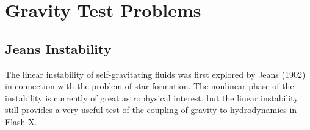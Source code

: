 
\section{Gravity Test Problems}

\subsection{Jeans Instability}
\label{Sec:SimulationJeans}
The linear instability of self-gravitating fluids was first explored by
Jeans (1902) in connection with the problem of star formation.
The nonlinear phase of the instability is currently of great astrophysical
interest, but the linear instability still provides a very useful
test of the coupling of gravity to hydrodynamics in Flash-X.

